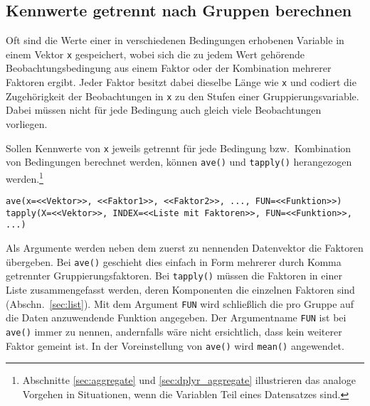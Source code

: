\subsection{Kennwerte getrennt nach Gruppen berechnen}
\label{sec:tapply}

Oft sind die Werte einer in verschiedenen Bedingungen erhobenen Variable in einem Vektor \lstinline!x! gespeichert, wobei sich die zu jedem Wert gehörende Beobachtungsbedingung aus einem Faktor oder der Kombination mehrerer Faktoren ergibt. Jeder Faktor besitzt dabei dieselbe Länge wie \lstinline!x! und codiert die Zugehörigkeit der Beobachtungen in \lstinline!x! zu den Stufen einer Gruppierungsvariable. Dabei müssen nicht für jede Bedingung auch gleich viele Beobachtungen vorliegen.

Sollen Kennwerte von \lstinline!x! jeweils getrennt für jede Bedingung bzw.\ Kombination von Bedingungen berechnet werden, können \lstinline!ave()! und \lstinline!tapply()! herangezogen werden.\footnote{Abschnitte \ref{sec:aggregate} und \ref{sec:dplyr_aggregate} illustrieren das analoge Vorgehen in Situationen, wenn die Variablen Teil eines Datensatzes sind.}
\begin{lstlisting}
ave(x=<<Vektor>>, <<Faktor1>>, <<Faktor2>>, ..., FUN=<<Funktion>>)
tapply(X=<<Vektor>>, INDEX=<<Liste mit Faktoren>>, FUN=<<Funktion>>, ...)
\end{lstlisting}

Als Argumente werden neben dem zuerst zu nennenden Datenvektor die Faktoren übergeben. Bei \lstinline!ave()! geschieht dies einfach in Form mehrerer durch Komma getrennter Gruppierungsfaktoren. Bei \lstinline!tapply()! müssen die Faktoren in einer Liste zusammengefasst werden, deren Komponenten die einzelnen Faktoren sind (Abschn.\ \ref{sec:list}). Mit dem Argument \lstinline!FUN! wird schließlich die pro Gruppe auf die Daten anzuwendende Funktion angegeben. Der Argumentname \lstinline!FUN! ist bei \lstinline!ave()! immer zu nennen, andernfalls wäre nicht ersichtlich, dass kein weiterer Faktor gemeint ist. In der Voreinstellung von \lstinline!ave()! wird \lstinline!mean()! angewendet.

